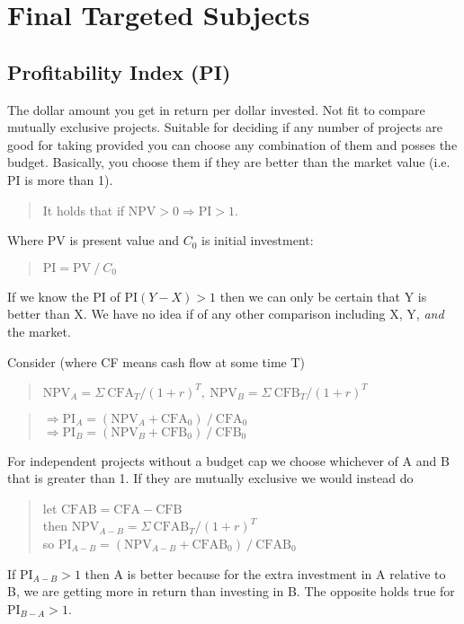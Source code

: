 \section{Final Targeted Subjects}
\subsection{Profitability Index (PI)}
The dollar amount you get in return per dollar invested. Not fit to
compare mutually exclusive projects. Suitable for deciding if any number
of projects are good for taking provided you can choose any combination
of them and posses the budget. Basically, you choose them if they are
better than the market value (i.e. PI is more than 1).

\blockquote{It holds that if $\text{NPV}>0\Rightarrow\text{PI}>1$.}

Where PV is present value and $C_0$ is initial investment:

\blockquote{$\text{PI} = \text{PV}~/~C_0$}

If we know the PI of $\text{PI}(Y-X) > 1$ then we can only be certain
that Y is better than X. We have no idea if of any other comparison
including X, Y, \textit{and} the market.

Consider (where CF means cash flow at some time T)

\blockquote{$\text{NPV}_A=\Sigma~\text{CFA}_T/(1+r)^T,~\text{NPV}_B=\Sigma~\text{CFB}_T/(1+r)^T$}

\blockquote{
  $\Rightarrow\text{PI}_A = (\text{NPV}_A+\text{CFA}_0)~/~\text{CFA}_0$ \\
  $\Rightarrow\text{PI}_B = (\text{NPV}_B+\text{CFB}_0)~/~\text{CFB}_0$
}

For independent projects without a budget cap we choose whichever of A
and B that is greater than 1. If they are mutually exclusive we would
instead do

\blockquote{
  let $\text{CFAB}=\text{CFA} - \text{CFB}$ \\
  then $\text{NPV}_{A-B}=\Sigma~\text{CFAB}_T/(1+r)^T$ \\
  so $\text{PI}_{A-B} = (\text{NPV}_{A-B}+\text{CFAB}_0)~/~\text{CFAB}_0$
}

If $\text{PI}_{A-B}>1$ then A is better because for the extra investment
in A relative to B, we are getting more in return than investing in B.
The opposite holds true for $\text{PI}_{B-A}>1$.

